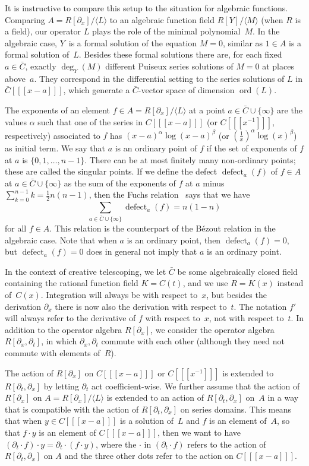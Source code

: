 \documentclass[final,1p,times,authoryear]{elsarticle}
\def\ord{\operatorname{ord}}
\def\<#1>{\langle#1\rangle}
\begin{document}
It is instructive to compare this setup to the situation for algebraic
functions. Comparing $A=R[\partial_x]/\<L>$ to an algebraic function field $R[Y]/\<M>$
(when $R$ is a field), our operator $L$ plays the role of the minimal
polynomial~$M$. In the algebraic case, $Y$~is a formal solution of the equation
$M=0$, similar as $1\in A$ is a formal solution of~$L$. Besides these formal
solutions there are, for each fixed $a\in\bar C$, exactly $\deg_Y(M)$ different
Puiseux series solutions of $M=0$ at places above~$a$. They correspond in the
differential setting to the series solutions of $L$ in $\bar C[[[x-a]]]$, which
generate a $\bar C$-vector space of dimension $\ord(L)$.

\def\defect{\operatorname{defect}}%
The exponents of an element $f\in A=R[\partial_x]/\<L>$ at a point $a\in\bar C\cup\{\infty\}$
are the values $\alpha$ such that one of the series in $C[[[x-a]]]$ (or $C[[[x^{-1}]]]$, respectively)
associated to $f$ has $(x-a)^\alpha\log(x-a)^\beta$ (or $(\frac1x)^\alpha\log(x)^\beta$) as initial
term. We say that $a$ is an ordinary point of $f$ if the set of exponents of $f$ at $a$ is $\{0,1,\dots,n-1\}$.
There can be at most finitely many non-ordinary points; these are called the singular points. If we define
the defect $\defect_a(f)$ of $f\in A$ at $a\in\bar C\cup\{\infty\}$ as the sum of the exponents of $f$ at $a$ minus
$\sum_{k=0}^{n-1}k=\frac12n(n-1)$, then the Fuchs relation~\citep{schlesinger95,ince26} says that we have
\[
 \sum_{a\in\bar C\cup\{\infty\}} \defect_a(f) = n(1-n)
\]
for all $f\in A$. This relation is the counterpart of the B\'{e}zout relation in the algebraic case.
Note that when $a$ is an ordinary point, then $\defect_a(f)=0$, but $\defect_a(f)=0$ does in
general not imply that $a$ is an ordinary point.

In the context of creative telescoping, we let $\bar C$ be some algebraically
closed field containing the rational function field $K=C(t)$, and we
use $R=K(x)$ instead of~$C(x)$. Integration will always be with respect to~$x$, but
besides the derivation $\partial_x$ there is now also the derivation with respect
to~$t$. The notation $f'$ will always refer to the derivative of $f$
with respect to~$x$, not with respect to~$t$. In addition to the operator
algebra $R[\partial_x]$, we consider the
operator algebra $R[\partial_x,\partial_t]$, in which $\partial_x,\partial_t$
commute with each other (although they need not commute with elements of~$R$).

The action of $R[\partial_x]$ on $C[[[x-a]]]$ or $C[[[x^{-1}]]]$ is extended
to $R[\partial_t,\partial_x]$ by letting $\partial_t$ act coefficient-wise.
We further assume that the action of $R[\partial_x]$ on $A=R[\partial_x]/\<L>$ is
extended to an action of $R[\partial_t,\partial_x]$ on~$A$ in a way that is
compatible with the action of $R[\partial_t,\partial_x]$ on series domains.
This means that when $y\in C[[[x-a]]]$ is a solution of~$L$ and $f$ is an
element of~$A$, so that $f\cdot y$ is an element of $C[[[x-a]]]$, then we
want to have $(\partial_t\cdot f)\cdot y=\partial_t\cdot(f\cdot y)$, where
the $\cdot$ in $(\partial_t\cdot f)$ refers to the action of $R[\partial_t,\partial_x]$
on $A$ and the three other dots refer to the action on $C[[[x-a]]]$.
\end{document}
